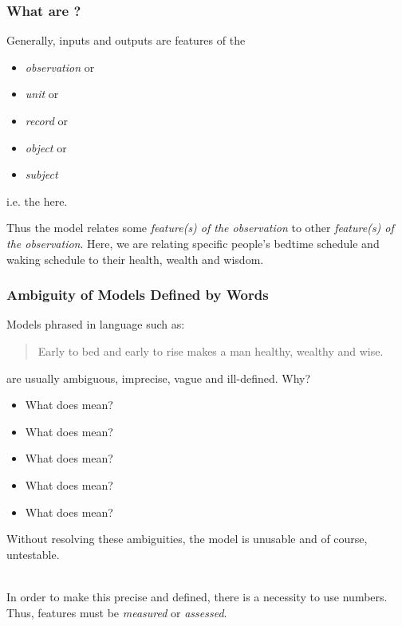 \documentclass[handout]{beamer}
\begin{document}
\begin{frame}\frametitle{What are ?}

Generally, inputs and outputs are features of the 

\begin{itemize}
\item \textit{observation} or 
\item \textit{unit} or 
\item \textit{record} or 
\item \textit{object} or 
\item \textit{subject}
\end{itemize} 

i.e. the  here.


Thus the model relates some \textit{feature(s) of the observation}  \pause to other \textit{feature(s) of the observation}.  \pause Here, we are relating specific people's bedtime schedule and waking schedule to their health, wealth and wisdom.
\end{frame}






\begin{frame}\frametitle{Ambiguity of Models Defined by Words}

\small
Models phrased in language such as:

\begin{quotation}
Early to bed and early to rise makes a man healthy, wealthy and wise.
\end{quotation}

are usually ambiguous, imprecise, vague and ill-defined. Why? \pause 

\begin{itemize}
\item What does  mean? 
\item What does  mean? 
\item What does  mean? 
\item What does  mean? 
\item What does  mean? \pause 
\end{itemize}

Without resolving these ambiguities, the model is unusable and of course, untestable. \\~\\ \pause


In order to make this precise and defined, there is a necessity to use numbers. \pause Thus, features must be \textit{measured} or \textit{assessed}. 
	
\end{frame}
\end{document}

